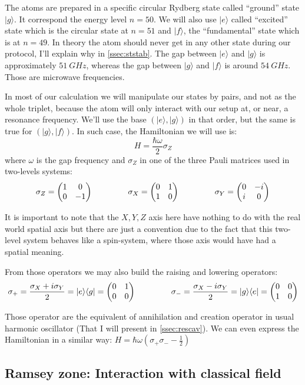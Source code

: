 \documentclass[10pt]{report}
\theoremstyle{plain}
\theoremstyle{definition}
\theoremstyle{remark}
\newcommand{\ket}[1]{|#1\rangle}
\newcommand{\bra}[1]{\langle#1|}
\newcommand{\mat}[1]{\begin{pmatrix}#1\end{pmatrix}}
\newcommand{\gap}{\hspace{1.5cm}}
\newcommand{\twoline}{\vphantom{\frac\int\int}}
\begin{document}
The atoms are prepared in a specific circular Rydberg state called ``ground'' state
$\ket g$. It correspond the energy level $n = 50$. We will also use $\ket e$
called ``excited'' state which is the circular state at $n = 51$ and $\ket f$, the
``fundamental'' state which is at $n = 49$. In theory the atom should never get
in any other state during our protocol, I'll explain why in \cref{ssec:ststab}.
The gap between $\ket e$ and $\ket g$ is
approximately $\SI{51}{GHz}$, whereas the gap between $\ket g$ and $\ket f$ is
around $\SI{54}{GHz}$. Those are microwave frequencies.

In most of our calculation we will manipulate our states by pairs, and not as the
whole triplet, because the atom will only interact with our setup at, or near,
a resonance frequency. We'll use the base $(\ket e, \ket g)$ in that order, but
the same is true for $(\ket g, \ket f)$. In such case, the Hamiltonian we will
use is:
\[H = \frac {\hbar \omega}2 \sigma_Z\]
 where $\omega$ is the gap frequency and $\sigma_Z$ in one of the
 three Pauli matrices used in two-levels systems:
\[\twoline \sigma_Z = \mat{1&0\\0&-1} \gap \sigma_X = \mat{0&1\\1&0} \gap
  \sigma_Y = \mat{0&-i\\i&0}\]

It is important to note that the $X,Y,Z$ axis here have nothing to do with the
real world spatial axis but there are just a convention due to the fact that
this two-level system behaves like a spin-system, where those axis would have had a
spatial meaning.

From those operators we may also build the raising and lowering operators:
\[\sigma_+ = \frac{\sigma_X + i \sigma_Y}2 = \ket e \bra g = \mat{0&1\\0&0}
  \gap
  \sigma_- = \frac{\sigma_X - i \sigma_Y}2 = \ket g \bra e= \mat{0&0\\1&0}\]

Those operator are the equivalent of annihilation and creation operator in usual
harmonic oscillator (That I will present in \cref{ssec:rescav}). We can even
express the Hamiltonian in a similar way: $H = \hbar \omega(\sigma_+\sigma_- - \frac12)$




\subsection{Ramsey zone: Interaction with classical field}\label{sec:ramsey}
\end{document}
